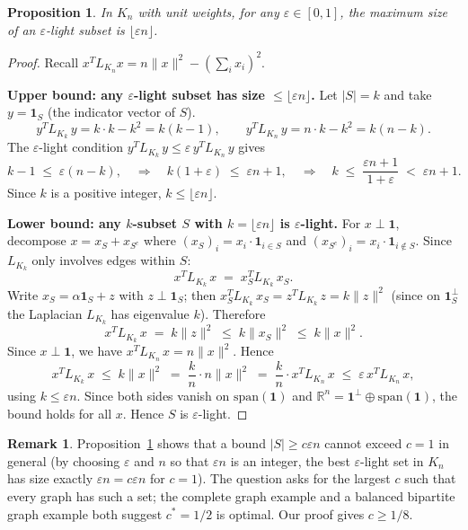 \documentclass[12pt]{article}
\newtheorem{proposition}[theorem]{Proposition}
\theoremstyle{definition}
\newtheorem{remark}[theorem]{Remark}
\begin{document}
\begin{proposition}\label{prop:Kn}
In $K_n$ with unit weights, for any $\varepsilon\in[0,1]$, the maximum size of an
$\varepsilon$-light subset is $\lfloor\varepsilon n\rfloor$.
\end{proposition}
\begin{proof}
Recall $x^T L_{K_n} x = n\|x\|^2 - (\sum_i x_i)^2$.

\medskip\noindent\textbf{Upper bound: any $\varepsilon$-light subset has size $\le\lfloor\varepsilon n\rfloor$.}
Let $|S|=k$ and take $y=\mathbf{1}_S$ (the indicator vector of $S$).
\[
   y^T L_{K_k}\, y = k\cdot k - k^2 = k(k-1),
   \qquad
   y^T L_{K_n}\, y = n\cdot k - k^2 = k(n-k).
\]
The $\varepsilon$-light condition $y^T L_{K_k}\,y\le\varepsilon\,y^T L_{K_n}\,y$ gives
\[
   k-1 \;\le\; \varepsilon(n-k),
   \quad\Longrightarrow\quad
   k(1+\varepsilon) \;\le\; \varepsilon n+1,
   \quad\Longrightarrow\quad
   k \;\le\; \frac{\varepsilon n+1}{1+\varepsilon} \;<\; \varepsilon n+1.
\]
Since $k$ is a positive integer, $k\le\lfloor\varepsilon n\rfloor$.

\medskip\noindent\textbf{Lower bound: any $k$-subset $S$ with $k=\lfloor\varepsilon n\rfloor$ is $\varepsilon$-light.}
For $x\perp\mathbf{1}$, decompose $x=x_S+x_{S^c}$ where $(x_S)_i=x_i\cdot\mathbf{1}_{i\in S}$
and $(x_{S^c})_i=x_i\cdot\mathbf{1}_{i\notin S}$.  Since $L_{K_k}$ only involves
edges within $S$:
\[
   x^T L_{K_k}\, x \;=\; x_S^T L_{K_k}\, x_S.
\]
Write $x_S=\alpha\mathbf{1}_S+z$ with $z\perp\mathbf{1}_S$; then
$x_S^T L_{K_k}\, x_S = z^T L_{K_k}\, z = k\|z\|^2$
(since on $\mathbf{1}_S^\perp$ the Laplacian $L_{K_k}$ has eigenvalue $k$).
Therefore
\[
   x^T L_{K_k}\, x \;=\; k\|z\|^2 \;\le\; k\|x_S\|^2 \;\le\; k\|x\|^2.
\]
Since $x\perp\mathbf{1}$, we have $x^T L_{K_n}\, x = n\|x\|^2$.  Hence
\[
   x^T L_{K_k}\, x
   \;\le\; k\|x\|^2
   \;=\; \frac{k}{n}\cdot n\|x\|^2
   \;=\; \frac{k}{n}\cdot x^T L_{K_n}\, x
   \;\le\; \varepsilon\, x^T L_{K_n}\, x,
\]
using $k\le\varepsilon n$.  Since both sides vanish on $\text{span}(\mathbf{1})$ and
$\mathbb{R}^n=\mathbf{1}^\perp\oplus\text{span}(\mathbf{1})$, the bound holds for
all $x$.  Hence $S$ is $\varepsilon$-light.
\end{proof}

\begin{remark}
Proposition~\ref{prop:Kn} shows that a bound $|S|\ge c\varepsilon n$ cannot
exceed $c=1$ in general (by choosing $\varepsilon$ and $n$ so that $\varepsilon n$ is an
integer, the best $\varepsilon$-light set in $K_n$ has size exactly $\varepsilon n=c\varepsilon n$
for $c=1$).  The question asks for the largest $c$ such that every graph has
such a set; the complete graph example and a balanced bipartite graph example
both suggest $c^*=1/2$ is optimal.  Our proof gives $c\ge 1/8$.
\end{remark}
\end{document}
